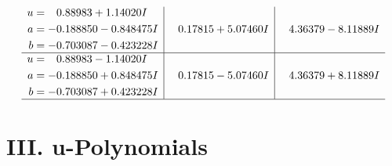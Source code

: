 \documentclass[1p]{elsarticle_modified}
\theoremstyle{definition}
\begin{document}
$$\begin{array}{c|c|c}
\begin{aligned}
u &= \phantom{-}0.88983 + 1.14020 I \\
a &= -0.188850 - 0.848475 I \\
b &= -0.703087 - 0.423228 I\end{aligned}
 & \phantom{-}0.17815 + 5.07460 I & \phantom{-}4.36379 - 8.11889 I \\ \hline\begin{aligned}
u &= \phantom{-}0.88983 - 1.14020 I \\
a &= -0.188850 + 0.848475 I \\
b &= -0.703087 + 0.423228 I\end{aligned}
 & \phantom{-}0.17815 - 5.07460 I & \phantom{-}4.36379 + 8.11889 I\\
 \hline 
 \end{array}$$\newpage
\newpage\renewcommand{\arraystretch}{1}
\centering \section*{ III. u-Polynomials}
\end{document}

